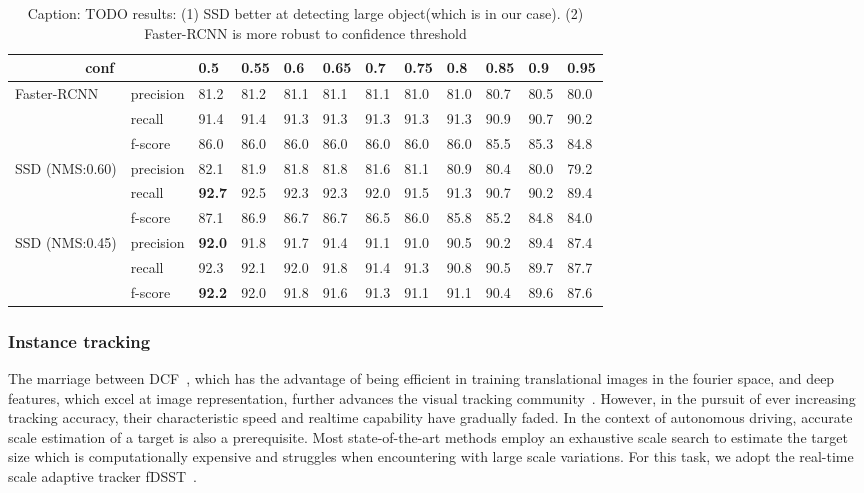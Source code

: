 \documentclass[10pt,twocolumn,letterpaper]{article}
\newcommand{\ra}[1]{\renewcommand{\arraystretch}{#1}}
\begin{document}
\begin{table}\centering
\ra{1.}
\begin{tabular}{@{}llllllllllll@{}}\toprule
\multicolumn{2}{c}{conf}  & 0.5  & 0.55 & 0.6 &  0.65 & 0.7  & 0.75 & 0.8 &  0.85 & 0.9  & 0.95\\
\hline
\multirow{3}{*}{Faster-RCNN}
                    &   precision & 81.2  & 81.2  & 81.1 & 81.1 & 81.1 & 81.0 & 81.0 & 80.7 & 80.5 & 80.0 \\
                    &   recall    & 91.4  & 91.4  & 91.3 & 91.3 & 91.3 & 91.3 & 91.3 & 90.9 & 90.7 & 90.2\\
                    &   f-score   & 86.0  & 86.0  & 86.0 & 86.0 & 86.0 & 86.0 & 86.0 & 85.5 & 85.3 & 84.8\\
                    \cline{2-12}
\multirow{3}{*}{SSD (NMS:0.60)}&   precision &  82.1  & 81.9  & 81.8  & 81.8  & 81.6  & 81.1 & 80.9  & 80.4 & 80.0  & 79.2\\
                            &    recall   & \textbf{92.7} & 92.5 & 92.3  & 92.3 & 92.0 & 91.5 & 91.3 & 90.7  & 90.2 & 89.4\\
                            &    f-score  & 87.1  & 86.9  & 86.7   &86.7&86.5& 86.0  & 85.8 &85.2 & 84.8 &84.0\\
                    \cline{2-12}
\multirow{3 }{*}{SSD (NMS:0.45)}&   precision & \textbf{92.0 } & 91.8 & 91.7 & 91.4 & 91.1 & 91.0 & 90.5 & 90.2 & 89.4 & 87.4\\
                                &    recall  & 92.3  & 92.1 & 92.0 & 91.8 & 91.4 & 91.3 & 90.8 & 90.5 & 89.7 & 87.7\\
                                &    f-score  & \textbf{92.2 } & 92.0 & 91.8 & 91.6 & 91.3 & 91.1 & 91.1 & 90.4 & 89.6 & 87.6\\

\bottomrule
\end{tabular}
\caption{Caption: TODO results: (1) SSD better at detecting large object(which is in our case). (2) Faster-RCNN  is more robust to confidence threshold}
\label{tab:ssd_fasterrcnn}
\end{table}

\subsubsection{Instance tracking}

The marriage between DCF~\cite{henriques2015high}, which has the advantage of being efficient in training translational images in the fourier space, and deep features, which excel at image representation, further advances the visual tracking community~\cite{qi2016hedged, danelljan2016eccv, wu2017kernalised, danelljan2017eco}. However, in the pursuit of ever increasing tracking accuracy, their characteristic speed and realtime capability have gradually faded. In the context of autonomous driving, accurate scale estimation of a target is also a prerequisite. Most state-of-the-art methods employ an exhaustive scale search to estimate the target size which is computationally expensive and struggles when encountering with large scale variations.
For this task, we adopt the real-time scale adaptive tracker fDSST~\cite{danelljan2017discriminative}.
\end{document}
